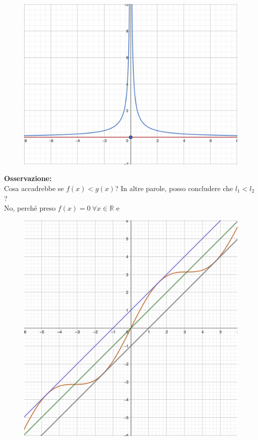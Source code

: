 \documentclass{article}
\begin{document}
\begin{figure}
\includegraphics[width=0.9\linewidth]{images/comparisonTheoremII-1.png} 
\end{figure}

\noindent\textbf{Osservazione:} \\
\noindent Cosa accadrebbe se $f(x) < g(x)$? In altre parole, posso concludere che $l_1 < l_2$?\\
No, perché preso $f(x) = 0 \ \forall x \in \mathbb{R}$ e 

\begin{figure}
\includegraphics[width=0.9\linewidth]{images/comparisonTheoremII-2.png} 
\end{figure}
\end{document}
